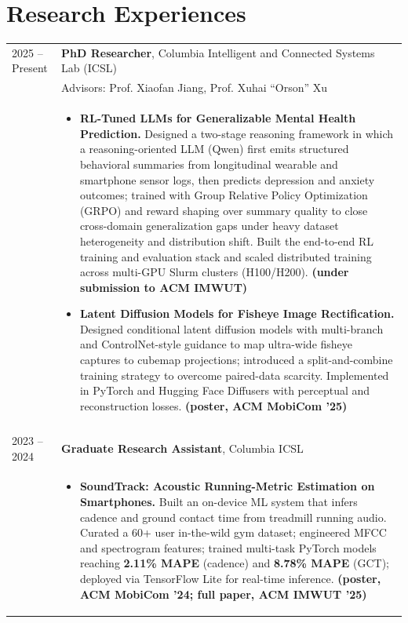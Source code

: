 \documentclass{article}
\begin{document}
\section*{Research Experiences}
\noindent
\begin{longtable}{@{}p{1in}p{5in}} %
2025 -- Present & \textbf{PhD Researcher}, Columbia Intelligent and Connected Systems Lab (ICSL) \\
               & Advisors: Prof. Xiaofan Jiang, Prof. Xuhai ``Orson'' Xu \\
               & \begin{itemize}[leftmargin=*, nosep]
                   \item[-] \textbf{RL-Tuned LLMs for Generalizable Mental Health Prediction.} Designed a two-stage reasoning framework in which a reasoning-oriented LLM (Qwen) first emits structured behavioral summaries from longitudinal wearable and smartphone sensor logs, then predicts depression and anxiety outcomes; trained with Group Relative Policy Optimization (GRPO) and reward shaping over summary quality to close cross-domain generalization gaps under heavy dataset heterogeneity and distribution shift. Built the end-to-end RL training and evaluation stack and scaled distributed training across multi-GPU Slurm clusters (H100/H200). \textbf{(under submission to ACM IMWUT)}
                   \item[-] \textbf{Latent Diffusion Models for Fisheye Image Rectification.} Designed conditional latent diffusion models with multi-branch and ControlNet-style guidance to map ultra-wide fisheye captures to cubemap projections; introduced a split-and-combine training strategy to overcome paired-data scarcity. Implemented in PyTorch and Hugging Face Diffusers with perceptual and reconstruction losses. \textbf{(poster, ACM MobiCom '25)}
                 \end{itemize} \\
               \\
2023 -- 2024 & \textbf{Graduate Research Assistant}, Columbia ICSL \\
               & \begin{itemize}[leftmargin=*, nosep]
                   \item[-] \textbf{SoundTrack: Acoustic Running-Metric Estimation on Smartphones.} Built an on-device ML system that infers cadence and ground contact time from treadmill running audio. Curated a 60+ user in-the-wild gym dataset; engineered MFCC and spectrogram features; trained multi-task PyTorch models reaching \textbf{2.11\% MAPE} (cadence) and \textbf{8.78\% MAPE} (GCT); deployed via TensorFlow Lite for real-time inference. \textbf{(poster, ACM MobiCom '24; full paper, ACM IMWUT '25)}

\end{itemize}
\end{longtable}
\end{document}
